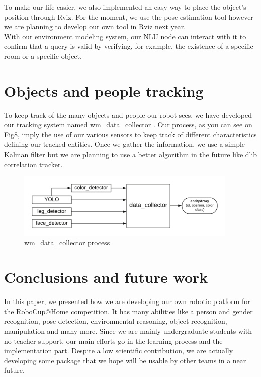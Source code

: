 \documentclass[runningheads,a4paper]{llncs}
\begin{document}
To make our life easier, we also implemented an easy way to place the object's position through Rviz. For the moment, we use the pose estimation tool however we are planning to develop our own tool in Rviz next year.\\

With our environment modeling system, our NLU node can interact with it to confirm that a query is valid by verifying, for example, the existence of a specific room or a specific object.  \\

\section{Objects and people tracking}

\tab To keep track of the many objects and people our robot sees, we have developed our tracking system named wm\_data\_collector \cite{data_collector}. Our process, as you can see on Fig8, imply the use of our various sensors to keep track of different characteristics defining our tracked entities. Once we gather the information, we use a simple Kalman filter but we are planning to use a better algorithm in the future like dlib correlation tracker. \\

\begin{figure}
  \centering
  \includegraphics[width=300pt]{images/wm_data_collector.png}
  \caption{ wm\_data\_collector process}
\end{figure} 


\section{Conclusions and future work} 
\tab In this paper, we presented how we are developing our own robotic platform for the RoboCup@Home competition. It has many abilities like a person and gender recognition, pose detection, environmental reasoning, object recognition, manipulation and many more. Since we are mainly undergraduate students with no teacher support, our main efforts go in the learning process and the implementation part. Despite a low scientific contribution, we are actually developing some package that we hope will be usable by other teams in a near future.\\
\end{document}
